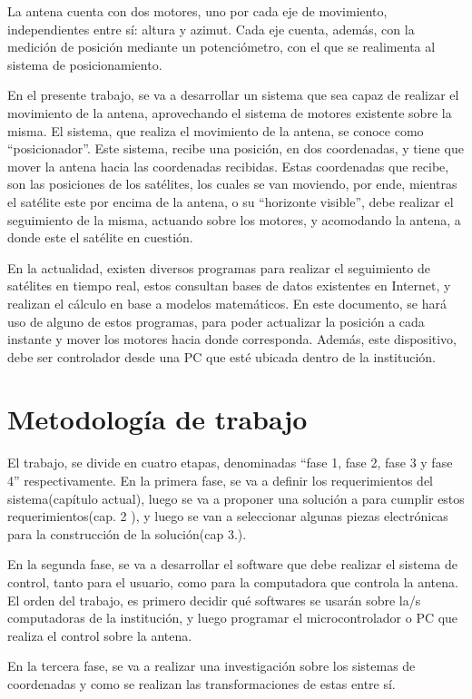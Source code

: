 La antena cuenta con dos motores, uno por cada eje de movimiento, independientes entre sí: altura y azimut. Cada eje cuenta, además, con la medición de posición mediante un potenciómetro, con el que se realimenta al sistema de posicionamiento. 

En el presente trabajo, se va a desarrollar un sistema que sea capaz de realizar el movimiento de la antena, aprovechando el sistema de motores existente sobre la misma. El sistema, que realiza el movimiento de la antena, se conoce como ``posicionador''. Este sistema, recibe una posición, en dos coordenadas, y tiene que mover la antena hacia las coordenadas recibidas. Estas coordenadas que recibe, son las posiciones de los satélites, los cuales se van moviendo, por ende, mientras el satélite este por encima de la antena, o su ``horizonte visible'', debe realizar el seguimiento de la misma, actuando sobre los motores, y acomodando la antena, a donde este el satélite en cuestión.

En la actualidad, existen diversos programas para realizar el seguimiento de satélites en tiempo real, estos consultan bases de datos existentes en Internet, y realizan el cálculo en base a modelos matemáticos. En este documento, se hará uso de alguno de estos programas, para poder actualizar la posición a cada instante y mover los motores hacia donde corresponda. Además, este dispositivo, debe ser controlador desde una PC que esté ubicada dentro de la institución. 

\section{Metodología de trabajo}

El trabajo, se divide  en cuatro etapas, denominadas ``fase 1, fase 2, fase 3 y fase 4'' respectivamente. En la primera fase, se va a definir los requerimientos del sistema(capítulo actual), luego se va a proponer una solución a para cumplir estos requerimientos(cap. 2 ), y luego se van a seleccionar algunas piezas electrónicas para la construcción de la solución(cap 3.). 

En la segunda fase, se va a desarrollar el software que debe realizar el sistema de control, tanto para el usuario, como para la computadora que controla la antena. El orden del trabajo, es primero decidir qué softwares se usarán sobre la/s computadoras de la institución, y luego programar el microcontrolador o PC que realiza el control sobre la antena.

En la tercera fase, se va a realizar una investigación sobre los sistemas de coordenadas y como se realizan las transformaciones de estas entre sí.

